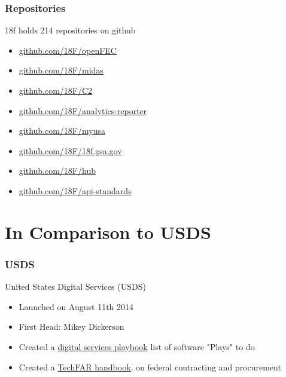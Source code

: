 \documentclass[10pt, compress]{beamer}
\begin{document}
\begin{frame}[fragile]
  \frametitle{Repositories}
  18f holds 214 repositories on github
  \begin{itemize}
    \item \href{https://github.com/18F/openFEC}{github.com/18F/openFEC}
    \item \href{https://github.com/18F/midas}{github.com/18F/midas}
    \item \href{https://github.com/18F/C2}{github.com/18F/C2}
    \item \href{https://github.com/18F/analytics-reporter}{github.com/18F/analytics-reporter}
    \item \href{https://github.com/18F/myusa}{github.com/18F/myusa}
    \item \href{https://github.com/18F/18f.gsa.gov}{github.com/18F/18f.gsa.gov}
    \item \href{https://github.com/18F/hub}{github.com/18F/hub}
    \item \href{https://github.com/18F/api-standards}{github.com/18F/api-standards}
  \end{itemize}
\end{frame}

\section{In Comparison to USDS}

\begin{frame}[fragile]
    \frametitle{USDS}
    United States Digital Services (USDS)
    \begin{itemize}
        \item Launched on August 11th 2014
        \item First Head: Mikey Dickerson
        \item Created a \alert{\href{https://playbook.cio.gov/}{digital services playbook}} list of software "Plays" to do
        \item Created a \alert{\href{https://playbook.cio.gov/techfar/}{TechFAR handbook}}, on federal contracting and procurement
    \end{itemize}
\end{frame}
\end{document}
